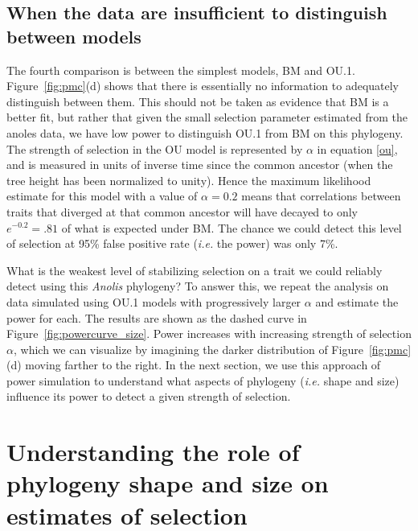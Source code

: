 \subsection{When the data are insufficient to distinguish between models} \label{sect:power}
The fourth comparison is between the simplest models, BM and OU.1. 
Figure~\ref{fig:pmc}(d)
shows that there is essentially no information to adequately distinguish between them.
This should not be taken as evidence that BM is a better fit,
but rather that 
given the small selection parameter estimated from the anoles data,
we have low power to distinguish OU.1 from BM on this phylogeny.  
The strength of selection in the OU model is represented by $\alpha$ in equation \eqref{ou},
and is measured in units of inverse time since the common ancestor (when the tree height has been normalized to unity).
Hence the maximum likelihood estimate for this model with a value of $\alpha = 0.2$
means that correlations between traits that diverged at that common ancestor will have decayed to only $e^{-0.2} =.81$ 
of what is expected under BM.
The chance we could detect this level of selection at 95\% false positive rate (\emph{i.e.} the power) was only 7\%. 

What is the weakest level of stabilizing selection on a trait we could reliably detect using this {\it Anolis} phylogeny?  
To answer this, we repeat the analysis on data simulated using OU.1 models
with progressively larger $\alpha$
and estimate the power for each.
The results are shown as the dashed curve in Figure~\ref{fig:powercurve_size}. 
Power increases with increasing strength of selection $\alpha$,
which we can visualize by imagining the darker distribution of Figure~\ref{fig:pmc}(d) moving farther to the right.
In the next section,
we use this approach of power simulation to understand what aspects of phylogeny 
(\emph{i.e.} shape and size) influence its power to detect a given strength of selection.  


\section{Understanding the role of phylogeny shape and size on estimates of selection}
\label{ss:shapesize}

